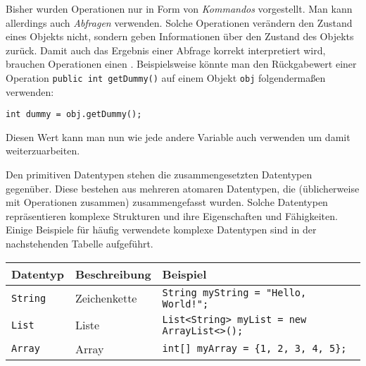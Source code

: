 \begin{Infobox}

Bisher wurden Operationen nur in Form von \textit{Kommandos} vorgestellt.
Man kann allerdings auch \textit{Abfragen} verwenden.
Solche Operationen verändern den Zustand eines Objekts nicht, sondern geben Informationen über den Zustand des Objekts zurück.
Damit auch das Ergebnis einer Abfrage korrekt interpretiert wird, brauchen Operationen einen .
Beispielsweise könnte man den Rückgabewert einer Operation \lstinline|public int getDummy()| auf einem Objekt \lstinline|obj| folgendermaßen verwenden:

\begin{lstlisting}[numbers=none]
int dummy = obj.getDummy();
\end{lstlisting}

Diesen Wert kann man nun wie jede andere Variable auch verwenden um damit weiterzuarbeiten.

\end{Infobox}

\addexcercise

\begin{Infobox}

Den primitiven Datentypen stehen die zusammengesetzten Datentypen gegenüber.
Diese bestehen aus mehreren atomaren Datentypen, die (üblicherweise mit Operationen zusammen) zusammengefasst wurden.
Solche Datentypen repräsentieren komplexe Strukturen und ihre Eigenschaften und Fähigkeiten.
Einige Beispiele für häufig verwendete komplexe Datentypen sind in der nachstehenden Tabelle aufgeführt.

\begin{center}
  \begin{tabular}{|l|l|l|}
    \hline
    \textbf{Datentyp} & \textbf{Beschreibung} & \textbf{Beispiel} \\
    \hline
    \texttt{String} & Zeichenkette & \lstinline|String myString = "Hello, World!";| \\
    \hline
    \texttt{List} & Liste & \lstinline|List<String> myList = new ArrayList<>();| \\
    \hline
    \texttt{Array} & Array & \lstinline|int[] myArray = {1, 2, 3, 4, 5};| \\
    \hline
  \end{tabular}
\end{center}

\end{Infobox}
\addexcercise

